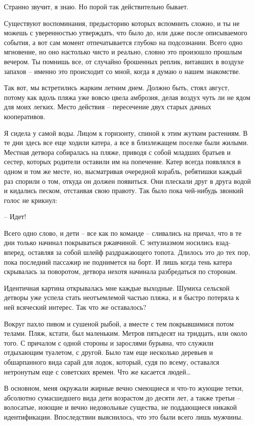 \documentclass[
]{book}
\begin{document}
Странно звучит, я знаю. Но порой так действительно бывает.

Существуют воспоминания, предысторию которых вспомнить сложно, и ты не можешь с уверенностью утверждать, что было до, или даже после описываемого события, а вот сам момент отпечатывается глубоко на подсознании. Всего одно мгновение, но оно настолько чисто и реально, словно это произошло прошлым вечером. Ты помнишь все, от случайно брошенных реплик, витавших в воздухе запахов -- именно это происходит со мной, когда я думаю о нашем знакомстве.

Так вот, мы встретились жарким летним днем. Должно быть, стоял август, потому как вдоль пляжа уже вовсю цвела амброзия, делая воздух чуть ли не ядом для моих легких. Место действия -- пересечение двух старых дачных кооперативов.

Я сидела у самой воды. Лицом к горизонту, спиной к этим жутким растениям. В те дни здесь все еще ходили катера, а все в близлежащем поселке были жилыми. Местная детвора собиралась на пляже, приводя с собой младших братьев и сестер, которых родители оставили им на попечение. Катер всегда появлялся в одном и том же месте, но, высматривая очередной корабль, ребятишки каждый раз спорили о том, откуда он должен появиться. Они плескали друг в друга водой и кидались песком, отстаивая свою правоту. Так было пока чей-нибудь звонкий голос не крикнул:

-- Идет!

Всего одно слово, и дети -- все как по команде -- сливались на причал, что в те дни только начинал покрываться ржавчиной. С энтузиазмом носились взад-вперед, оставляя за собой шлейф раздражающего топота. Длилось это до тех пор, пока последний пассажир не поднимется на борт. И лишь когда тень катера скрывалась за поворотом, детвора нехотя начинала разбредаться по сторонам.

Идентичная картина открывалась мне каждые выходные. Шумиха сельской детворы уже успела стать неотъемлемой частью пляжа, и я быстро потеряла к ней всяческий интерес. Так что же оставалось?

Вокруг пахло пивом и сушеной рыбой, а вместе с тем покрывшимися потом телами. Пляж, кстати, был маленьким. Метров пятьдесят на тридцать, или около того. С причалом с одной стороны и зарослями бурьяна, что служили отдыхающим туалетом, с другой. Было там еще несколько деревьев и обшарпанного вида сарай для лодок, который, судя по всему, оставался нетронутым еще с советских времен. Что же касается людей\ldots{}

В основном, меня окружали жирные вечно смеющиеся и что-то жующие тетки, абсолютно сумасшедшего вида дети возрастом до десяти лет, а также третьи -- волосатые, ноющие и вечно недовольные существа, не поддающиеся никакой идентификации. Впоследствии выяснилось, что это были всего лишь мужчины.
\end{document}
